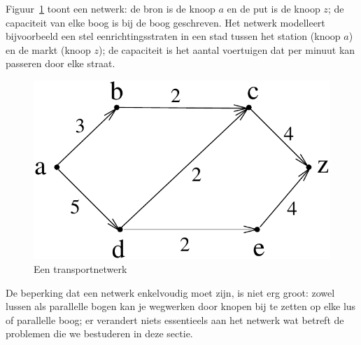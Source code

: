 Figuur~\ref{transport1} toont een netwerk: de bron is de knoop $a$ en de
put is de knoop $z$; de capaciteit van elke boog is bij de boog
geschreven. Het netwerk modelleert bijvoorbeeld een stel
eenrichtingsstraten in een stad tussen het station (knoop $a$) en de
markt (knoop $z$); de capaciteit is het aantal voertuigen dat per minuut
kan passeren door elke straat.

\begin{figure}[ht]
\begin{center}
\includegraphics[width=0.3\linewidth,keepaspectratio]{transport1} %
\end{center}
\caption{Een transportnetwerk \label{transport1}}
\end{figure}

De beperking dat een netwerk enkelvoudig moet zijn, is niet erg groot:
zowel lussen als parallelle bogen kan je wegwerken door knopen bij te
zetten op elke lus of parallelle boog; er verandert niets essentieels
aan het netwerk wat betreft de problemen die we bestuderen in deze
sectie.


